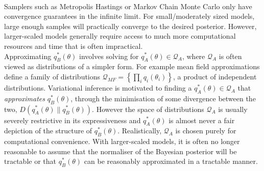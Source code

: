 \documentclass{article}
\numberwithin{equation}{section}
\begin{document}
\newline
\\Samplers such as Metropolis Hastings or Markov Chain Monte Carlo only have convergence guarantees in the infinite limit. For small/moderately sized models, large enough samples will practically converge to the desired posterior. However, larger-scaled models generally require access to much more computational resources and time that is often impractical.
\newline
\\Approximating $q_B^*(\theta)$ involves solving for $q_A^*(\theta) \in \mathcal{Q}_{A}$, where $\mathcal{Q}_{A}$ is often viewed as distributions of a simpler form. For example mean field approximations define a family of distributions $\mathcal{Q}_{MF} = \left\{\prod_i q_i(\theta_i)\right\}$, a product of independent distributions. Variational inference is motivated to finding a $q_A^*(\theta) \in \mathcal{Q}_{A}$ that \textit{approximates} $q_B^*(\theta)$, through the minimisation of some divergence between the two, $D(q_A^*(\theta)\| q_B^*(\theta))$. However the space of distributions $\mathcal{Q}_{A}$ is usually severely restrictive in its expressiveness and $q_A^*(\theta)$ is almost never a fair depiction of the structure of $q_B^*(\theta)$. Realistically, $\mathcal{Q}_{A}$ is chosen purely for computational convenience. With larger-scaled models, it is often no longer reasonable to assume that the normaliser of the Bayesian posterior will be tractable or that $q_B^*(\theta)$ can be reasonably approximated in a tractable manner.
\end{document}
